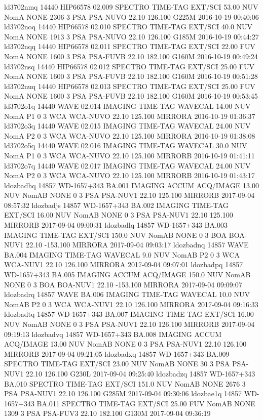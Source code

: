 ld3702nmq 14440 HIP66578 02.009 SPECTRO TIME-TAG EXT/SCI 53.00 NUV NomA NONE 2306 3 PSA PSA-NUVO 22.10 126.100 G225M 2016-10-19 00:40:06
ld3702noq 14440 HIP66578 02.010 SPECTRO TIME-TAG EXT/SCI 40.0 NUV NomA NONE 1913 3 PSA PSA-NUVO 22.10 126.100 G185M 2016-10-19 00:44:27
ld3702nqq 14440 HIP66578 02.011 SPECTRO TIME-TAG EXT/SCI 22.00 FUV NomA NONE 1600 3 PSA PSA-FUVB 22.10 182.100 G160M 2016-10-19 00:49:24
ld3702nsq 14440 HIP66578 02.012 SPECTRO TIME-TAG EXT/SCI 25.00 FUV NomA NONE 1600 3 PSA PSA-FUVB 22.10 182.100 G160M 2016-10-19 00:51:28
ld3702nuq 14440 HIP66578 02.013 SPECTRO TIME-TAG EXT/SCI 25.00 FUV NomA NONE 1600 3 PSA PSA-FUVB 22.10 182.100 G160M 2016-10-19 00:53:45
ld3702o1q 14440 WAVE 02.014 IMAGING TIME-TAG WAVECAL 14.00 NUV NomA P1 0 3 WCA WCA-NUVO 22.10 125.100 MIRRORA 2016-10-19 01:36:37
ld3702o3q 14440 WAVE 02.015 IMAGING TIME-TAG WAVECAL 24.00 NUV NomA P2 0 3 WCA WCA-NUVO 22.10 125.100 MIRRORA 2016-10-19 01:38:08
ld3702o5q 14440 WAVE 02.016 IMAGING TIME-TAG WAVECAL 30.0 NUV NomA P1 0 3 WCA WCA-NUVO 22.10 125.100 MIRRORB 2016-10-19 01:41:11
ld3702o7q 14440 WAVE 02.017 IMAGING TIME-TAG WAVECAL 24.00 NUV NomA P2 0 3 WCA WCA-NUVO 22.10 125.100 MIRRORB 2016-10-19 01:43:17
ldozbadhq 14857 WD-1657+343 BA.001 IMAGING ACCUM ACQ/IMAGE 13.00 NUV NomAB NONE 0 3 PSA PSA-NUV1 22.10 125.100 MIRRORB 2017-09-04 08:57:32
ldozbadjs 14857 WD-1657+343 BA.002 IMAGING TIME-TAG EXT/SCI 16.00 NUV NomAB NONE 0 3 PSA PSA-NUV1 22.10 125.100 MIRRORB 2017-09-04 09:00:31
ldozbadlq 14857 WD-1657+343 BA.003 IMAGING TIME-TAG EXT/SCI 150.0 NUV NomAB NONE 0 3 BOA BOA-NUV1 22.10 -153.100 MIRRORA 2017-09-04 09:03:17
ldozbadnq 14857 WAVE BA.004 IMAGING TIME-TAG WAVECAL 9.0 NUV NomAB P2 0 3 WCA WCA-NUV1 22.10 126.100 MIRRORA 2017-09-04 09:07:01
ldozbadpq 14857 WD-1657+343 BA.005 IMAGING ACCUM ACQ/IMAGE 150.0 NUV NomAB NONE 0 3 BOA BOA-NUV1 22.10 -153.100 MIRRORA 2017-09-04 09:09:07
ldozbadrq 14857 WAVE BA.006 IMAGING TIME-TAG WAVECAL 10.0 NUV NomAB P2 0 3 WCA WCA-NUV1 22.10 126.100 MIRRORA 2017-09-04 09:16:33
ldozbadtq 14857 WD-1657+343 BA.007 IMAGING TIME-TAG EXT/SCI 16.00 NUV NomAB NONE 0 3 PSA PSA-NUV1 22.10 126.100 MIRRORB 2017-09-04 09:19:13
ldozbadvq 14857 WD-1657+343 BA.008 IMAGING ACCUM ACQ/IMAGE 13.00 NUV NomAB NONE 0 3 PSA PSA-NUV1 22.10 126.100 MIRRORB 2017-09-04 09:21:05
ldozbadxq 14857 WD-1657+343 BA.009 SPECTRO TIME-TAG EXT/SCI 23.00 NUV NomAB NONE 30 3 PSA PSA-NUV1 22.10 126.100 G230L 2017-09-04 09:25:40
ldozbadzq 14857 WD-1657+343 BA.010 SPECTRO TIME-TAG EXT/SCI 151.0 NUV NomAB NONE 2676 3 PSA PSA-NUV1 22.10 126.100 G285M 2017-09-04 09:30:06
ldozbae1q 14857 WD-1657+343 BA.011 SPECTRO TIME-TAG EXT/SCI 25.00 FUV NomAB NONE 1309 3 PSA PSA-FUV3 22.10 182.100 G130M 2017-09-04 09:36:19
